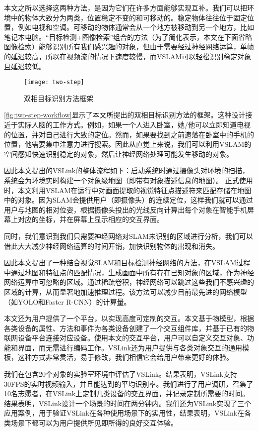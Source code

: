 本文之所以选择这两种方法，是因为它们在许多方面能够实现互补。我们可以把环境中的物体大致分为两类，位置稳定不变的和可移动的。稳定物体往往位于固定位置，例如电视和空调。可移动的物体通常会从一个地方被移动到另一个地方，比如笔记本电脑。“目标检测+图像检索”组合的方法（为了简化表示，本文在下面省略图像检索）能够识别所有我们感兴趣的对象，但由于需要经过神经网络运算，单帧的延迟较高，所以在视频流的情况下速度较慢，而VSLAM可以轻松识别稳定对象且延迟较低。
  
\begin{figure}[htbp]
	\centering
	\texttt{[image: two-step]}
	\caption{双相目标识别方法框架}
	\label{fig:two-step-workflow}
\end{figure}
  
\autoref{fig:two-step-workflow}显示了本文所提出的双相目标识别方法的框架。这种设计接近于实际人脑的工作方式。例如，如果一个人进入卧室，她/他可以立即知道电视的位置，并对自己进行大致的定位。然而，如果要找到之前遗落在卧室中的手机的位置，他需要集中注意力进行搜索。因此从直觉上来说，我们可以利用VSLAM的空间感知快速识别稳定的对象，然后让神经网络处理可能发生移动的对象。

因此本文提出的VSLink的整体流程如下：启动系统时通过摄像头对环境的扫描，系统会为环境实时构建一个对象级地图（即带有对象描述信息的地图）。
正式使用时，本文利用VSLAM在运行中对画面提取的视觉特征点描述符来匹配存储在地图中的对象。因为SLAM会提供用户（即摄像头）的连续定位，这样我们就可以通过用户与地图的相对位姿，根据摄像头投出的光线反向计算出每个对象在智能手机屏幕上对应的坐标，并在屏幕上显示相应的交互界面。

同时，我们意识到我们只需要神经网络对SLAM未识别的区域进行分析，我们可以借此大大减少神经网络运算的时间开销，加快识别物体的出现和消失。

因此本文提出了一种结合视觉SLAM和目标检测神经网络的方法，在VSLAM过程中通过地图和特征点的匹配情况，生成画面中所有存在已知对象的区域，作为神经网络运算中可忽略的区域。通过稀疏卷积\cite{ren2018sbnet}，神经网络可以跳过这些我们不感兴趣的区域的计算，从而显著地加速推理过程。该方法可以减少目前最先进的网络模型（如YOLO和Faster R-CNN）的计算量。

本文还为用户提供了一个平台，以实现高度可定制的交互。本文基于物模型，根据各类设备的属性、方法和事件为各类设备创建了一个交互组件库，并基于已有的物联网设备平台连接对应设备。使用本文的交互平台，用户可以自定义交互对象、功能和界面，而无需进行编码工作。VSLink还为用户提供与各类对象交互的通用模板，这种方式非常灵活，易于修改，我们相信它会给用户带来更好的体验。

我们在包含20个对象的实验室环境中评估了VSLink。结果表明，VSLink支持30FPS的实时视频输入，并且能达到{\acc}的平均识别率。我们进行了用户调研，召集了10名志愿者，在VSLink上定制几类设备的交互界面，并记录定制所需要的时间。结果表明，VSLink设计一个场景的时间在两分钟内。我们还为VSLink实现了三个应用案例，用于验证VSLink在各种使用场景下的实用性，结果表明，VSLink在各类场景下都可以为用户提供所见即所得的良好交互体验。

